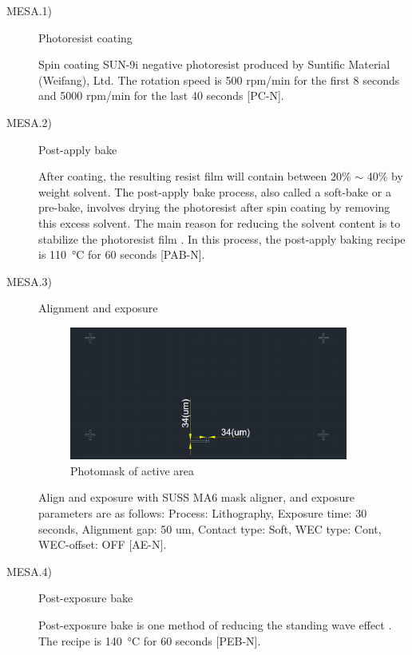 \begin{description}

	\item[MESA.1)] Photoresist coating
	
	Spin coating SUN-9i  negative photoresist produced by Suntific Material (Weifang), Ltd. The rotation speed is 500 rpm/min for the first 8 seconds and 5000 rpm/min for the last 40 seconds [PC-N].
	
	\item[MESA.2)] Post-apply bake
	
	After  coating, the resulting resist film will contain between 20$\%$ $\sim$ 40$\%$ by weight solvent. The post-apply bake  process, also called a soft-bake or a pre-bake, involves drying the photoresist after spin coating by removing this excess solvent. The main reason for reducing the solvent content is to stabilize the photoresist film \cite{mack2008fundamental}. In this process, the post-apply baking recipe is \SI{110}{\degreeCelsius} for 60 seconds [PAB-N].
	
	\item[MESA.3)] Alignment and exposure
	
\begin{figure}[H] 
\centering    
\includegraphics[width=0.9\textwidth]{active area}
\caption[Photomask of active area]{Photomask  of active area}
\label{fig:active area}
\end{figure}
	
	Align and exposure with SUSS MA6 mask aligner, and exposure parameters are as follows: Process: Lithography, Exposure time: 30 seconds, Alignment gap: 50 \unit{um}, Contact type: Soft, WEC type: Cont, WEC-offset: OFF [AE-N].
	
	\item[MESA.4)] Post-exposure bake
	
	Post-exposure bake  is one method of reducing the standing wave effect \cite{mack2008fundamental}. The recipe is \SI{140}{\degreeCelsius} for 60 seconds [PEB-N].
	

\end{description}
